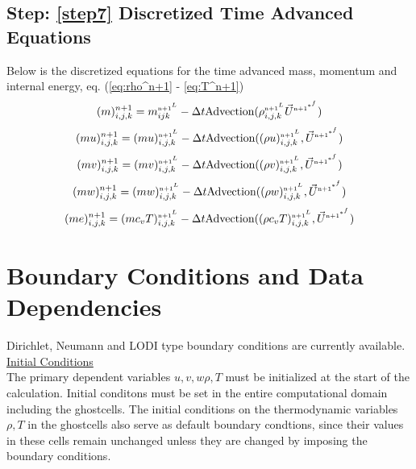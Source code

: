 \documentclass[fleqn]{article}
\begin{document}
{\subsection{ Step: \ref{step7}  \textsf{Discretized Time Advanced Equations}}
Below is the discretized equations for the time advanced mass, momentum and
internal energy, eq. (\ref{eq:rho^n+1} - \ref{eq:T^n+1})  \\
%
\begin{equation}
(m)^{n+1}_{i,j,k} = \massnnL_{ijk} - \delt\text{Advection}(\rho^{\nadv^{L}}_{i,j,k}\ustar)
\end{equation}
%
\begin{equation}
(mu)^{n+1}_{i,j,k} =(m u)^{\nadv^{L}}_{i,j,k} - \delt\text{Advection}( (\rho u)^{\nadv^{L}}_{i,j,k},\ustar)
\end{equation}
%
\begin{equation}
(mv)^{n+1}_{i,j,k} =(m v)^{\nadv^{L}}_{i,j,k} - \delt\text{Advection}( (\rho v)^{\nadv^{L}}_{i,j,k}, \ustar)
\end{equation}
%
\begin{equation}
(mw)^{n+1}_{i,j,k} =(m w)^{\nadv^{L}}_{i,j,k} - \delt\text{Advection}( (\rho w)^{\nadv^{L}}_{i,j,k}, \ustar)
\end{equation}
%
\begin{equation}
(me)^{n+1}_{i,j,k} =(m c_v T)^{\nadv^{L}}_{i,j,k} - \delt\text{Advection}( (\rho c_v T)^{\nadv^{L}}_{i,j,k}, \ustar)
\end{equation}
\par
%
%
%
%
\iffalse
\section{\textsf{Boundary Conditions and Data Dependencies}}
Dirichlet, Neumann and LODI type boundary conditions are currently available.\\
\underline{Initial Conditions}\\
The primary dependent variables $u, v, w \rho, T$ must be initialized at
the start of the calculation.  Initial conditons must be set in the entire
computational domain including the ghostcells.  The initial conditions on
the thermodynamic variables $\rho, T$ in the ghostcells also serve as default
boundary condtions, since their values in these cells remain unchanged unless
they are changed by imposing the boundary conditions.\\

}
\end{document}
